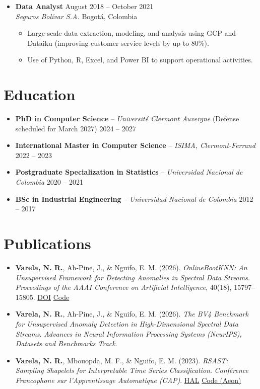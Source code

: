 \documentclass[12pt,a4paper]{article}
\begin{document}
\begin{itemize}
\item \textbf{Data Analyst} \hfill August 2018 -- October 2021\\
\textit{Seguros Bolívar S.A.} \hfill Bogotá, Colombia
\begin{itemize}
\item Large-scale data extraction, modeling, and analysis using GCP and Dataiku (improving customer service levels by up to 80\%).
\item Use of Python, R, Excel, and Power BI to support operational activities.
\end{itemize}
\end{itemize}

\section*{Education}
\begin{itemize}
\item \textbf{PhD in Computer Science} -- \textit{Université Clermont Auvergne} (Defense scheduled for March 2027) \hfill 2024 -- 2027
\item \textbf{International Master in Computer Science} -- \textit{ISIMA, Clermont-Ferrand} \hfill 2022 -- 2023
\item \textbf{Postgraduate Specialization in Statistics} -- \textit{Universidad Nacional de Colombia} \hfill 2020 -- 2021
\item \textbf{BSc in Industrial Engineering} -- \textit{Universidad Nacional de Colombia} \hfill 2012 -- 2017
\end{itemize}

\section*{Publications}
\begin{itemize}
\item \textbf{Varela, N. R.}, Ah-Pine, J., \& Nguifo, E. M. (2026). \textit{OnlineBootKNN: An Unsupervised Framework for Detecting Anomalies in Spectral Data Streams}. \textit{Proceedings of the AAAI Conference on Artificial Intelligence}, 40(18), 15797--15805. \href{https://doi.org/10.1609/aaai.v40i18.38611}{DOI} \textbar{} \href{https://github.com/nirojasva/spectral-benchmark}{Code}
\item \textbf{Varela, N. R.}, Ah-Pine, J., \& Nguifo, E. M. (2026). \textit{The BV4 Benchmark for Unsupervised Anomaly Detection in High-Dimensional Spectral Data Streams}. \textit{Advances in Neural Information Processing Systems (NeurIPS), Datasets and Benchmarks Track}.
\item \textbf{Varela, N. R.}, Mbouopda, M. F., \& Nguifo, E. M. (2023). \textit{RSAST: Sampling Shapelets for Interpretable Time Series Classification}. \textit{Conférence Francophone sur l'Apprentissage Automatique (CAP)}. \href{https://hal.science/hal-04311309/}{HAL} \textbar{} \href{https://www.aeon-toolkit.org/en/v1.1.0/api_reference/auto_generated/aeon.transformations.collection.shapelet_based.RSAST.html}{Code (Aeon)}
\end{itemize}
\end{document}
